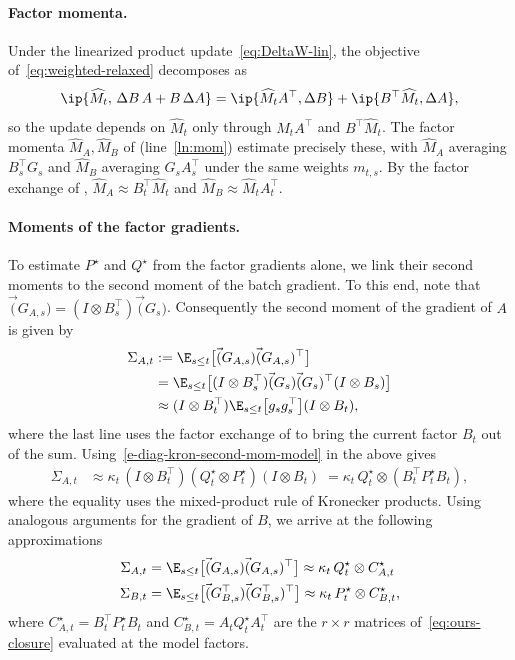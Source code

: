 \paragraph{Factor momenta.} Under the linearized product
update~\eqref{eq:DeltaW-lin}, the objective of~\eqref{eq:weighted-relaxed}
decomposes as
\[
  \ip{\widehat M_t,\,\Delta B\,A+B\,\Delta A}
  =\ip{\widehat M_tA^\top,\Delta B}+\ip{B^\top\widehat M_t,\Delta A},
\]
so the update depends on $\widehat M_t$ only through
$\widehat M_tA^\top$ and $B^\top\widehat M_t$. The factor momenta
$\widehat M_A,\widehat M_B$ of  (line~\ref{ln:mom})
estimate precisely these, with $\widehat M_A$ averaging $B_s^\top G_s$
and $\widehat M_B$ averaging $G_sA_s^\top$ under the same weights
$m_{t,s}$. By the factor exchange of ,
$\widehat M_A\approx B_t^\top\widehat M_t$ and
$\widehat M_B\approx\widehat M_tA_t^\top$.

\paragraph{Moments of the factor gradients.} To estimate $P^\star$ and $Q^\star$ from the factor gradients alone, we link their second moments to the second moment of the batch gradient. To this end, note that
$\vec(G_{A,s})=(I\otimes B_s^\top)\vec(G_s)$. Consequently the second moment of the gradient of $A$ is given by
\begin{align*}
 \Sigma_{A,t} &:=  \E_{s \leq t}\big[ \vec(G_{A,s})  \vec(G_{A,s})^\top\big]  \\
 &=  \E_{s \leq t}\big[ (I\otimes B_s^\top)\vec(G_s)\vec(G_s)^\top   (I\otimes B_s)\big]  \\
   &\approx  (I\otimes B_t^\top) \E_{s \leq t}\big[ g_s g_s^\top   \big]  (I\otimes B_t),
\end{align*}
where the last line uses the factor exchange of  to bring the current factor $B_t$ out of the sum. Using~\eqref{e-diag-kron-second-mom-model} in the above gives
\begin{align*}
 \Sigma_{A,t} 
   &\approx  \kappa_t\,  (I\otimes B_t^\top)  (Q^\star_t\otimes P^\star_t)  (I\otimes B_t) \; = \kappa_t\,   Q^\star_t\otimes  (B_t^\top P^\star_t B_t),
\end{align*} 
where the equality uses the mixed-product rule of Kronecker products.
Using analogous arguments for the gradient of $B$, we arrive at the following approximations
\begin{align}
  \Sigma_{A,t} & =\E_{s \leq t}\big[\vec(G_{A,s})\vec(G_{A,s})^\top\big] \approx\kappa_t\,Q^\star_t\otimes C^\star_{A,t} \nonumber \\
  \Sigma_{B,t}&=\E_{s \leq t}\big[\vec(G_{B,s}^\top)\vec(G_{B,s}^\top)^\top\big] \approx \kappa_t\,P^\star_t\otimes C^\star_{B,t}, \label{eq:observable-moments}
\end{align}
where $C^\star_{A,t}=B_t^\top P^\star_tB_t$ and $C^\star_{B,t}=A_tQ^\star_tA_t^\top$ are the $r\times r$ matrices of~\eqref{eq:ours-closure} evaluated at the model factors.

